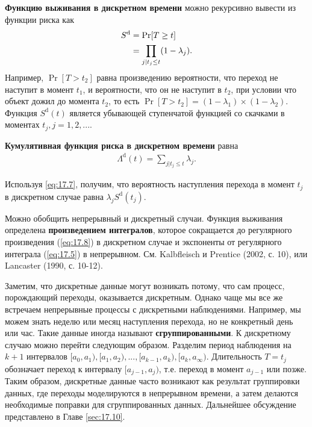 \textbf{Функцию выживания в дискретном времени} можно рекурсивно вывести из функции риска как
    \begin{align}
    \label{eq:17.8}
    S^{\mathrm{d}} &= \Pr[T \ge t]\\
    &= \prod_{j|t_j \le t} (1 - \lambda_j). \notag
    \end{align}
Например, $\Pr{[T>t_2]}$ равна произведению вероятности, что переход не наступит в момент $t_1$, и вероятности, что он не наступит в $t_2$, при условии что объект дожил до момента $t_2$, то есть $\Pr{[T>t_2]}=(1-\lambda_1)\times(1-\lambda_2)$. Функция $S^\mathrm{d}(t)$ является убывающей ступенчатой функцией со скачками в моментах $t_j,j=1,2,....$

\textbf{Кумулятивная функция риска в дискретном времени} равна
    \begin{align}
    \label{eq:17.9}
    \Lambda^{\mathrm{d}}(t) = \sum_{j|t_j \le t} \lambda_j.
    \end{align}

Используя \ref{eq:17.7}, получим, что вероятность наступления перехода в момент $t_j$ в дискретном случае равна $\lambda_j S^\mathrm{d}(t_j).$

Можно обобщить непрерывный и дискретный случаи. Функция выживания определена \textbf{произведением интегралов}, которое сокращается до регулярного произведения (\ref{eq:17.8}) в дискретном случае и экспоненты от регулярного интеграла (\ref{eq:17.5}) в непрерывном. См. Kalbfleisch и Prentice (2002, с. 10), или Lancaster (1990, с. 10-12).

Заметим, что дискретные данные могут возникать потому, что сам процесс, порождающий переходы, оказывается дискретным. Однако чаще мы все же встречаем непрерывные процессы с дискретными наблюдениями. Например, мы можем знать неделю или месяц наступления перехода, но не конкретный день или час. Такие данные иногда называют \textbf{сгруппированными}. К дискретному случаю можно перейти следующим образом. Разделим период наблюдения на $k + 1$ интервалов $[a_0,a_1), [a_1,a_2), ..., [a_{k-1},a_{k}), [a_{k},a_{\infty})$. Длительность $T=t_j$ обозначает переход к интервалу $[a_{j-1},a_{j})$, т.е. переход в момент $a_{j-1}$ или позже. Таким образом, дискретные данные часто возникают как результат группировки данных, где переходы моделируются в непрерывном времени, а затем делаются необходимые поправки для сгруппированных данных. Дальнейшее обсуждение представлено в Главе \ref{sec:17.10}.




